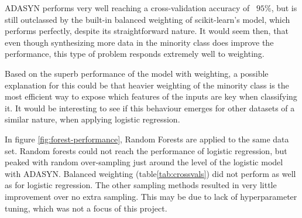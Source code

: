 ADASYN performs very well reaching a cross-validation
accuracy of ~$95\%$, but is still outclassed by the built-in balanced
weighting of scikit-learn's model, which performs perfectly, despite its
straightforward nature. It would seem then, that even though synthesizing 
more data in the minority class does improve the performance, 
this type of problem responds extremely well to weighting.

Based on the superb performance of the model with weighting, a possible 
explanation for this could be that heavier weighting of the minority
class is the most efficient way to expose which features of the inputs are
key when classifying it. It would be interesting to see if this behaviour
emerges for other datasets of a similar nature, when applying logistic
regression.

In figure \ref{fig:forest-performance}, Random Forests are applied to the
same data set. Random forests could not reach the performance of logistic
regression, but peaked with random over-sampling just around the level of the 
logistic model with ADASYN. Balanced weighting (table\ref{tab:crossvals})
did not perform as well as for logistic regression.
The other sampling methods resulted in very little improvement over no 
extra sampling. This may be due to lack of hyperparameter tuning, 
which was not a focus of this project.



